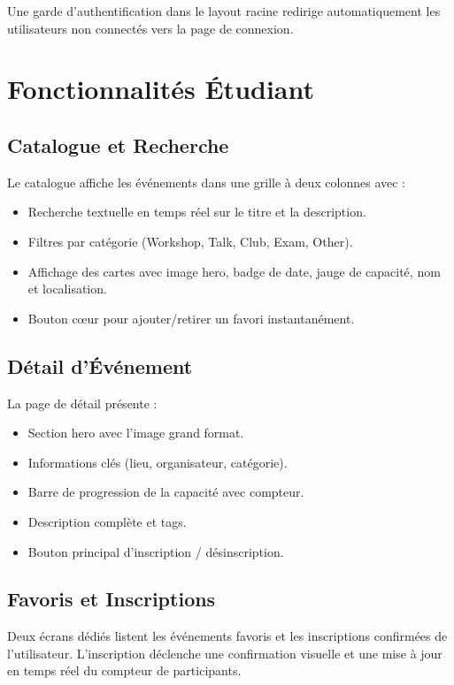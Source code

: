 \documentclass[a4paper,12pt]{report}
\begin{document}
Une garde d'authentification dans le layout racine redirige automatiquement les utilisateurs non connect\'{e}s vers la page de connexion.

\section{Fonctionnalit\'{e}s \'{E}tudiant}

\subsection{Catalogue et Recherche}
Le catalogue affiche les \'{e}v\'{e}nements dans une grille \`{a} deux colonnes avec :
\begin{itemize}[leftmargin=2em]
    \item Recherche textuelle en temps r\'{e}el sur le titre et la description.
    \item Filtres par cat\'{e}gorie (Workshop, Talk, Club, Exam, Other).
    \item Affichage des cartes avec image hero, badge de date, jauge de capacit\'{e}, nom et localisation.
    \item Bouton c{\oe}ur pour ajouter/retirer un favori instantan\'{e}ment.
\end{itemize}

\subsection{D\'{e}tail d'\'{E}v\'{e}nement}
La page de d\'{e}tail pr\'{e}sente :
\begin{itemize}[leftmargin=2em]
    \item Section hero avec l'image grand format.
    \item Informations cl\'{e}s (lieu, organisateur, cat\'{e}gorie).
    \item Barre de progression de la capacit\'{e} avec compteur.
    \item Description compl\`{e}te et tags.
    \item Bouton principal d'inscription / d\'{e}sinscription.
\end{itemize}

\subsection{Favoris et Inscriptions}
Deux \'{e}crans d\'{e}di\'{e}s listent les \'{e}v\'{e}nements favoris et les inscriptions confirm\'{e}es de l'utilisateur. L'inscription d\'{e}clenche une confirmation visuelle et une mise \`{a} jour en temps r\'{e}el du compteur de participants.
\end{document}
